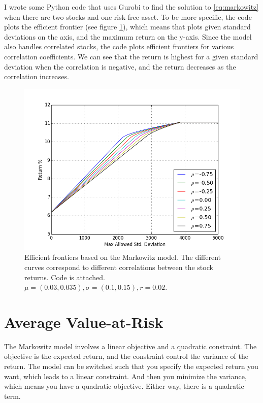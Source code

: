 \documentclass{amsart}
\theoremstyle{definition}
\theoremstyle{remark}
\begin{document}
I wrote some Python code that uses Gurobi to find the solution to \ref{eq:markowitz} when there are two stocks and one risk-free asset. To be more specific, the code plots the efficient frontier (see figure \ref{fig:markowitz}), which means that plots given standard deviations on the axis, and the maximum return on the y-axis. Since the model also handles correlated stocks, the code plots efficient frontiers for various correlation coefficients. We can see that the return is highest for a given standard deviation when the correlation is negative, and the return decreases as the correlation increases.
\begin{figure}
\centering
\includegraphics[scale=0.5]{markowitz.png}
\caption{Efficient frontiers based on the Markowitz model. The different curves correspond to different correlations between the stock returns.  Code is attached. $\mu = (0.03, 0.035), \sigma=(0.1, 0.15), r = 0.02$.}
\label{fig:markowitz}
\end{figure}

\section{Average Value-at-Risk}
The Markowitz model involves a linear objective and a quadratic constraint. The objective is the expected return, and the constraint control the variance of the return. The model can be switched such that you specify the expected return you want, which leads to a linear constraint. And then you minimize the variance, which means you have a quadratic objective. Either way, there is a quadratic term.
\end{document}
